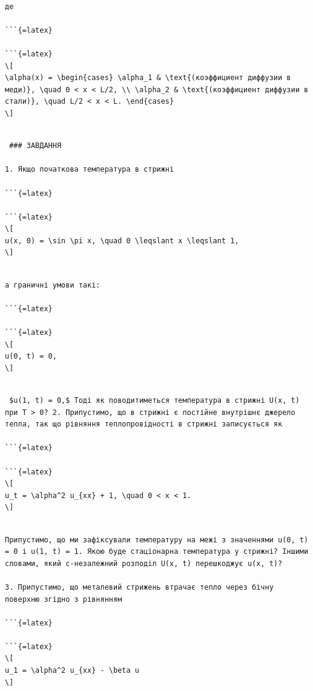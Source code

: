 \documentclass[
]{article}
\begin{document}
\begin{verbatim}

де 

```{=latex}

```{=latex}
\[
\alpha(x) = \begin{cases} \alpha_1 & \text{(коэффициент диффузии в меди)}, \quad 0 < x < L/2, \\ \alpha_2 & \text{(коэффициент диффузии в стали)}, \quad L/2 < x < L. \end{cases}
\]
\end{verbatim}

\begin{verbatim}

 ### ЗАВДАННЯ

1. Якщо початкова температура в стрижні

```{=latex}

```{=latex}
\[
u(x, 0) = \sin \pi x, \quad 0 \leqslant x \leqslant 1,
\]
\end{verbatim}

\begin{verbatim}

а граничні умови такі:

```{=latex}

```{=latex}
\[
u(0, t) = 0,
\]
\end{verbatim}

\begin{verbatim}

 $u(1, t) = 0,$ Тоді як поводитиметься температура в стрижні U(x, t) при T > 0? 2. Припустимо, що в стрижні є постійне внутрішнє джерело тепла, так що рівняння теплопровідності в стрижні записується як

```{=latex}

```{=latex}
\[
u_t = \alpha^2 u_{xx} + 1, \quad 0 < x < 1.
\]
\end{verbatim}

\begin{verbatim}

Припустимо, що ми зафіксували температуру на межі з значеннями u(0, t) = 0 і u(1, t) = 1. Якою буде стаціонарна температура у стрижні? Іншими словами, який c-незалежний розподіл U(x, t) перешкоджує u(x, t)?

3. Припустимо, що металевий стрижень втрачає тепло через бічну поверхню згідно з рівнянням

```{=latex}

```{=latex}
\[
u_1 = \alpha^2 u_{xx} - \beta u
\]
\end{verbatim}
\end{document}
